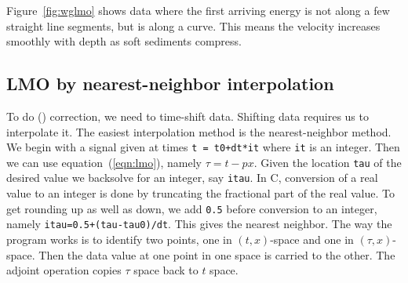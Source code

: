 
\par
Figure~\ref{fig:wglmo} shows data where the first arriving energy
is not along a few straight line segments,
but is along a curve.
This means the velocity increases smoothly with depth
as soft sediments compress.

\subsection{LMO by nearest-neighbor interpolation}
To do  () correction, we need to time-shift data.
Shifting data requires us to interpolate it.
The easiest interpolation method is the nearest-neighbor method.
We begin with a signal given at times {\tt t = t0+dt*it}
where {\tt it} is an integer.
Then we can use equation~(\ref{eqn:lmo}),
namely $\tau=t-px$.
Given the location {\tt tau} of the desired value
we backsolve for an integer, say {\tt itau}.
In C, conversion of a real value to an integer is done by
truncating the fractional part of the real value.
To get rounding up as well as down,
we add
{\tt 0.5}
before conversion to an integer,
namely {\tt itau=0.5+(tau-tau0)/dt}.
This gives the nearest neighbor.
The
way the program works is to identify two points,
one in $(t,x)$-space and one in $(\tau,x)$-space.
Then
the data value at one point in one space is carried to the other.
The adjoint operation copies $\tau$ space back to $t$ space.

